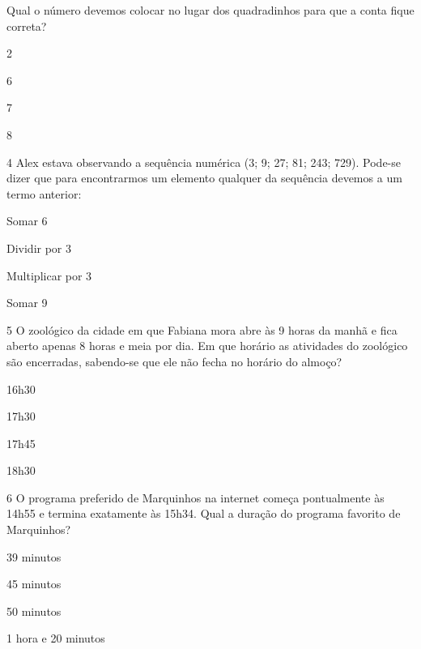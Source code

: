 Qual o número devemos colocar no lugar dos quadradinhos para que a conta
fique correta?

\begin{minipage}{.5\textwidth}
\begin{escolha}
\item
  2
\item
  6
\item
  7
\item
  8
\end{escolha}
\end{minipage}


\num{4} Alex estava observando a sequência numérica (3; 9; 27; 81; 243;
729). Pode-se dizer que para encontrarmos um elemento qualquer da
sequência devemos a um termo anterior:

\begin{minipage}{.5\textwidth}
\begin{escolha}
\item
  Somar 6
\item
  Dividir por 3
\item
  Multiplicar por 3
\item
  Somar 9
\end{escolha}
\end{minipage}


\num{5} O zoológico da cidade em que Fabiana mora abre às 9 horas da manhã
e fica aberto apenas 8 horas e meia por dia. Em que horário as atividades 
do zoológico são encerradas, sabendo-se que ele não fecha no horário do
almoço?

\begin{minipage}{.5\textwidth}
\begin{escolha}
\item
  16h30
\item
  17h30
\item
  17h45
\item
  18h30
\end{escolha}
\end{minipage}


\pagebreak
\num{6} O programa preferido de Marquinhos na internet começa pontualmente
às 14h55 e termina exatamente às 15h34.
Qual a duração do programa favorito de Marquinhos?

\begin{minipage}{.5\textwidth}
\begin{escolha}
\item
  39 minutos
\item
  45 minutos
\item
  50 minutos
\item
  1 hora e 20 minutos
\end{escolha}
\end{minipage}


